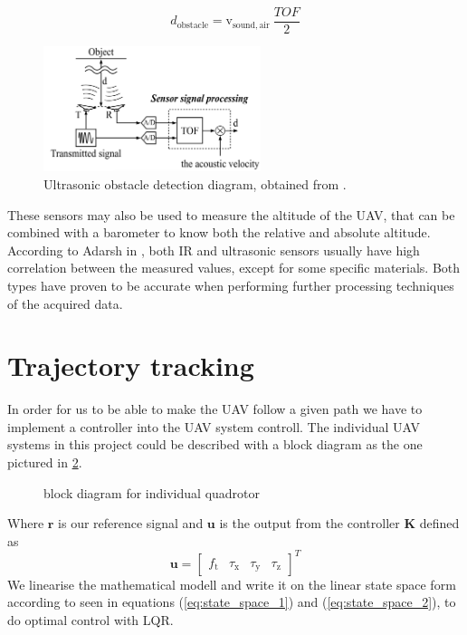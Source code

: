 \documentclass[journal]{IEEEtran}
\newcommand*{\subb}[1]{_{\mathrm{#1}}}
\begin{document}
	\begin{equation} \label{eq:ultrasonic_formula}
	d\subb{obstacle} = \textrm{v}\subb{sound, air} \ \frac{TOF}{2}
	\end{equation}
	\begin{figure}[H]
		\centering
		\includegraphics[width=2.5in]{ultrasonic2}
		\caption{Ultrasonic obstacle detection diagram, obtained from \cite{hirata2008cross}.}
		\label{fig:ultrasonic}
	\end{figure}
	
	These sensors may also be used to measure the altitude of the UAV, that can be combined with a barometer to know both the relative and absolute altitude. According to Adarsh in \cite{AdarshS2016PcoI}, both IR and ultrasonic sensors usually have high correlation between the measured values, except for some specific materials. Both types have proven to be accurate when performing further processing techniques of the acquired data.
	
	
	\section{Trajectory tracking}
	In order for us to be able to make the UAV follow a given path we have to implement a controller into the UAV system controll. The individual UAV systems in this project could be described with a block diagram as the one pictured in \figurename{\ref{fig:block_diagram}}.
	\begin{figure}[h]
		\centering
		
		\caption{block diagram for individual quadrotor}
		\label{fig:block_diagram}
	\end{figure}	
	Where $\bm{r}$ is our reference signal and $\bm{u}$ is the output from the controller $\bm{K}$ defined as
	\begin{equation} \label{eq:uvect}
		\bm{u} = \left[ {\begin{array}{cccc}	
    f\subb{t} & \tau\subb{x} & \tau\subb{y} & \tau\subb{z}
	\end{array} } \right]^T
	\end{equation}
	 We linearise the mathematical modell  and write it on the linear state space form according to \cite{SabatinoFrancesco2015Qcmn} seen in equations (\ref{eq:state_space_1}) and (\ref{eq:state_space_2}), to do optimal control with LQR.
\end{document}
